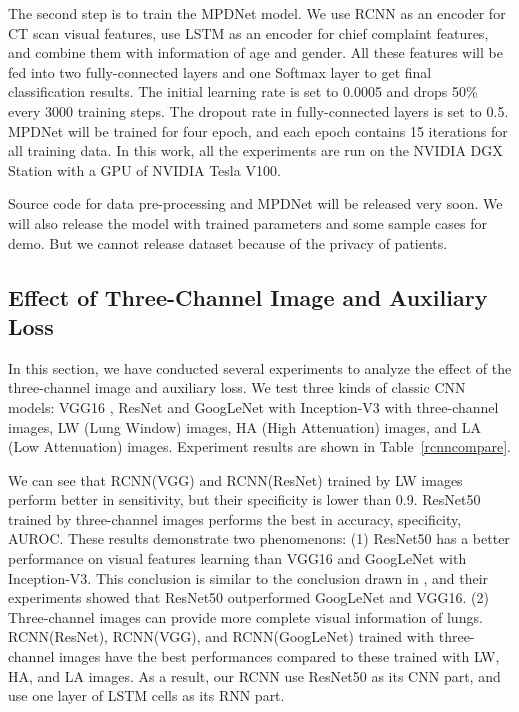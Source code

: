 \documentclass[journal]{IEEEtran}
\begin{document}
The second step is to train the MPDNet model. We use RCNN as an encoder for CT scan visual features, use LSTM as an encoder for chief complaint features, and combine them with information of age and gender. All these features will be fed into two fully-connected layers and one Softmax layer to get final classification results. The initial learning rate is set to 0.0005 and drops 50\% every 3000 training steps. The dropout rate in fully-connected layers is set to 0.5. MPDNet will be trained for four epoch, and each epoch contains 15 iterations for all training data. In this work, all the experiments are run on the NVIDIA DGX Station with a GPU of NVIDIA Tesla V100. 

Source code for data pre-processing and MPDNet will be released very soon. We will also release the model with trained parameters and some sample cases for demo. But we cannot release dataset because of the privacy of patients. 

    
\subsection{Effect of Three-Channel Image and Auxiliary Loss}
\label{effectiveness}

In this section, we have conducted several experiments to
analyze the effect of the three-channel image and auxiliary loss. 
We test three kinds of classic CNN models: VGG16 \cite{simonyan2015very}, ResNet \cite{he2016deep} and GoogLeNet with Inception-V3 \cite{szegedy2016rethinking} with three-channel images, LW (Lung Window) images, HA (High Attenuation) images, and LA (Low Attenuation) images. Experiment results are shown in Table~\ref{rcnncompare}. 

We can see that RCNN(VGG) and RCNN(ResNet) trained by LW images perform better in sensitivity, but their specificity is lower than 0.9. ResNet50 trained by three-channel images performs the best in accuracy, specificity, AUROC.
These results demonstrate two phenomenons: (1) ResNet50 has a better performance on visual features learning than VGG16 and GoogLeNet with Inception-V3. This conclusion is similar to the conclusion drawn in \cite{Wang2017ChestX}, and their experiments showed that ResNet50 outperformed GoogLeNet and VGG16. (2) Three-channel images can provide more complete visual information of lungs. RCNN(ResNet), RCNN(VGG), and RCNN(GoogLeNet) trained with three-channel images have the best performances compared to these trained with LW, HA, and LA images. 
As a result, our RCNN use ResNet50 as its CNN part, and use one layer of LSTM cells as its RNN part. 
\end{document}
